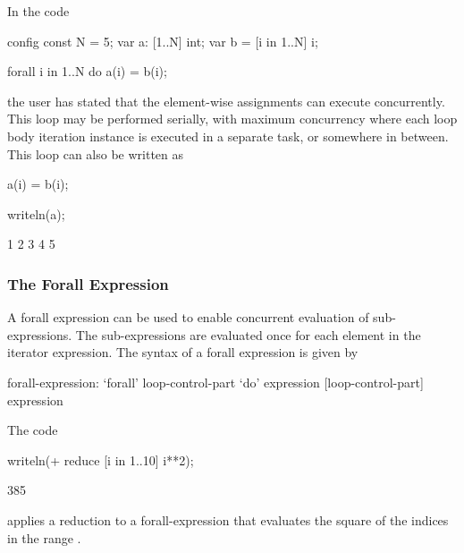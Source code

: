 \begin{example}
In the code
\begin{chapelpre}
config const N = 5;
var a: [1..N] int;
var b = [i in 1..N] i;
\end{chapelpre}
\begin{chapel}
forall i in 1..N do
  a(i) = b(i);
\end{chapel}
the user has stated that the element-wise assignments can execute
concurrently.  This loop may be performed serially, with maximum
concurrency where each loop body iteration instance is executed in a
separate task, or somewhere in between.  This loop can also be written
as
\begin{chapel}
[i in 1..N] a(i) = b(i);
\end{chapel}
\begin{chapelpost}
writeln(a);
\end{chapelpost}
\begin{chapeloutput}
1 2 3 4 5
\end{chapeloutput}
\end{example}

\subsubsection{The Forall Expression}
\label{Forall_Expressions}

A forall expression can be used to enable concurrent evaluation of
sub-expressions.  The sub-expressions are evaluated once for each
element in the iterator expression.  The syntax of a forall expression
is given by
\begin{syntax}
forall-expression:
  `forall' loop-control-part `do' expression
  [loop-control-part] expression
\end{syntax}

\begin{example}
The code
\begin{chapelpre}
\end{chapelpre}
\begin{chapel}
writeln(+ reduce [i in 1..10] i**2);
\end{chapel}
\begin{chapeloutput}
385
\end{chapeloutput}
applies a reduction to a forall-expression that evaluates the square
of the indices in the range .
\end{example}

